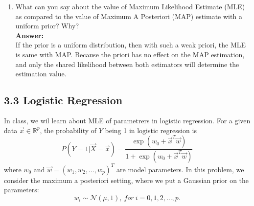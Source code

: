 \documentclass{article}
\begin{document}
\begin{enumerate}
	\item What can you say about the value of Maximum Likelihood Estimate (MLE) as compared to the value of Maximum A Posteriori (MAP) estimate with a uniform prior? Why?
	\\\textbf{Answer:}\\
	If the prior is a uniform distribution, then with such a weak priori, the MLE is same with MAP. Because the priori has no effect on the MAP estimation, and only the shared likelihood between both estimators will determine the estimation value.
\end{enumerate}

\subsection*{3.3 Logistic Regression}

In class, we wil learn about MLE of parametrers in logistic regression. For a given data $\vec{x}\in \mathbb{R}^p$, the probability of $Y$ being 1 in logistic regression is
\begin{equation}
\label{eq:logistic}
P(Y=1|\vec{X}=\vec{x})=\frac{\exp(w_0+\vec{x}^T\vec{w})}{1+\exp(w_0+\vec{x}^T\vec{w})}
\end{equation}
where $w_0$ and $\vec{w}=(w_1,w_2,\dots,w_p)^T$ are model parameters. In this problem, we consider the maximum a posteriori setting, where we put a Gaussian prior on the parameters:
$$w_i\sim \mathcal{N}(\mu,1),~for~i=0,1,2,\dots,p.$$
\end{document}
